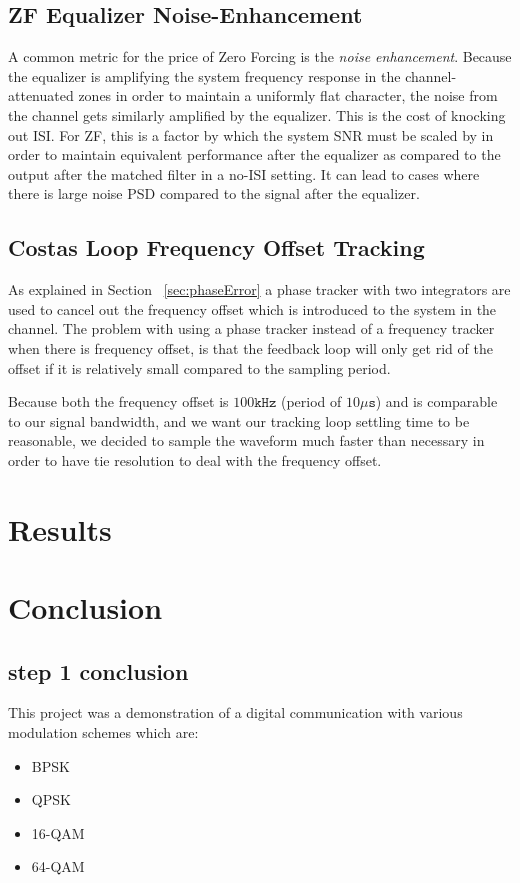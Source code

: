 \documentclass[]{article}
\begin{document}
\subsection{ZF Equalizer Noise-Enhancement}

A common metric for the price of Zero Forcing is the \emph{noise enhancement}.  Because the equalizer is amplifying the system frequency response in the channel-attenuated zones in order to maintain a uniformly flat character, the noise from the channel gets similarly amplified by the equalizer.  This is the cost of knocking out ISI.  For ZF, this is a factor by which the system SNR must be scaled by in order to maintain equivalent performance after the equalizer as compared to the output after the matched filter in a no-ISI setting.  It can lead to cases where there is large noise PSD compared to the signal after the equalizer.

\subsection{Costas Loop Frequency Offset Tracking}
As explained in Section ~\ref{sec:phaseError} a phase tracker with two integrators are used to cancel out the frequency offset which is introduced to the system in the channel. The problem with using a phase tracker instead of a frequency tracker when there is frequency offset, is that the feedback loop will only get rid of the offset if it is relatively small compared to the sampling period. 

Because both the frequency offset is $100 \mathtt{kHz}$ (period of $10 \mathtt{\mu s}$) and is comparable to our signal bandwidth, and we want our tracking loop settling time to be reasonable, we decided to sample the waveform much faster than necessary in order to have tie resolution to deal with the frequency offset.

\newpage
\section{Results}
\label{sec:results}

\newpage
\section{Conclusion}
\subsection{step 1 conclusion}
This project was a demonstration of a digital communication with various modulation schemes which are:
\begin{itemize}
\item BPSK
\item QPSK
\item 16-QAM
\item 64-QAM
\end{itemize}
\end{document}
